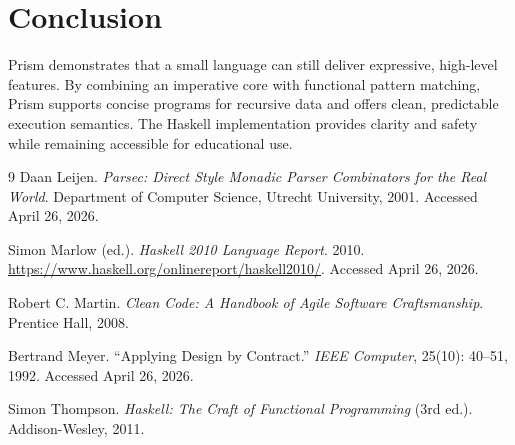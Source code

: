 \documentclass[11pt]{article}
\begin{document}
\section{Conclusion}
Prism demonstrates that a small language can still deliver expressive, high-level features. By combining an imperative core with functional pattern matching, Prism supports concise programs for recursive data and offers clean, predictable execution semantics. The Haskell implementation provides clarity and safety while remaining accessible for educational use.

\begin{thebibliography}{9}
Daan Leijen. \textit{Parsec: Direct Style Monadic Parser Combinators for the Real World}. Department of Computer Science, Utrecht University, 2001. Accessed April 26, 2026.

Simon Marlow (ed.). \textit{Haskell 2010 Language Report}. 2010. \url{https://www.haskell.org/onlinereport/haskell2010/}. Accessed April 26, 2026.

Robert C. Martin. \textit{Clean Code: A Handbook of Agile Software Craftsmanship}. Prentice Hall, 2008.

Bertrand Meyer. ``Applying Design by Contract.'' \textit{IEEE Computer}, 25(10): 40--51, 1992. Accessed April 26, 2026.

Simon Thompson. \textit{Haskell: The Craft of Functional Programming} (3rd ed.). Addison-Wesley, 2011.
\end{thebibliography}
\end{document}
